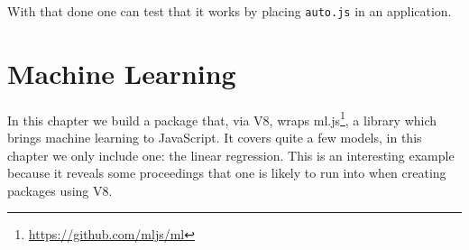 \documentclass[
]{krantz}
\makeatletter
\newenvironment{Shaded}{\begin{snugshade}}{\end{snugshade}}
\newcommand{\ControlFlowTok}[1]{\textcolor[rgb]{0.27,0.27,0.27}{\textbf{#1}}}
\newcommand{\DataTypeTok}[1]{\textcolor[rgb]{0.27,0.27,0.27}{#1}}
\newcommand{\DecValTok}[1]{\textcolor[rgb]{0.06,0.06,0.06}{#1}}
\newcommand{\KeywordTok}[1]{\textcolor[rgb]{0.27,0.27,0.27}{\textbf{#1}}}
\newcommand{\NormalTok}[1]{#1}
\newcommand{\OperatorTok}[1]{\textcolor[rgb]{0.43,0.43,0.43}{\textbf{#1}}}
\newcommand{\StringTok}[1]{\textcolor[rgb]{0.5,0.5,0.5}{#1}}
\renewcommand{\href}[2]{#2\footnote{\url{#1}}}
\newenvironment{kframe}{%
\medskip{}
\setlength{\fboxsep}{.8em}
 \def\at@end@of@kframe{}%
 \ifinner\ifhmode%
  \def\at@end@of@kframe{\end{minipage}}%
  \begin{minipage}{\columnwidth}%
 \fi\fi%
 \def\FrameCommand##1{\hskip\@totalleftmargin \hskip-\fboxsep
 \colorbox{shadecolor}{##1}\hskip-\fboxsep
     \hskip-\linewidth \hskip-\@totalleftmargin \hskip\columnwidth}%
 \MakeFramed {\advance\hsize-\width
   \@totalleftmargin\z@ \linewidth\hsize
   \@setminipage}}%
 {\par\unskip\endMakeFramed%
 \at@end@of@kframe}
\renewenvironment{Shaded}{\begin{kframe}}{\end{kframe}}
\makeatother
\begin{document}
With that done one can test that it works by placing \texttt{auto.js} in an application.

\begin{Shaded}
\end{Shaded}

\hypertarget{machine-learning}{%
\chapter{Machine Learning}\label{machine-learning}}

In this chapter we build a package that, via V8, wraps \href{https://github.com/mljs/ml}{ml.js}, a library which brings machine learning to JavaScript. It covers quite a few models, in this chapter we only include one: the linear regression. This is an interesting example because it reveals some proceedings that one is likely to run into when creating packages using V8.
\end{document}
